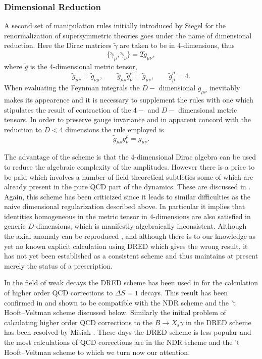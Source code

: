 \documentclass[12pt,rotate]{article}
\def\gat{\tilde{\gamma}}
\def\gt{\tilde{g}}
\newcommand{\be}{\begin{equation}}
\newcommand{\ee}{\end{equation}}
\begin{document}
\begin{itemize}
 \subsubsection{Dimensional Reduction}
 A second set of manipulation rules initially introduced by Siegel
 \cite{Si} for the renormalization of supersymmetric theories goes under
 the name of dimensional reduction. Here the Dirac matrices $\gat$ are taken
 to be in 4-dimensions, thus
\be\label{BW4}
 \{ \gat_{\mu} , \gat_{\nu} \} = 2 \gt_{\mu \nu},
\ee
 where $\gt$ is the 4-dimensional metric tensor,
\be\label{BW5}
 \gt_{\mu \nu} = \gt_{\nu \mu}, \qquad
 \gt_{\mu \rho} \gt^{\rho}_{\nu} = \gt_{\mu \nu}, \qquad
 \gt_{\mu}^{\mu} = 4.
\ee
 When evaluating the Feynman integrals the $D-$ dimensional
 $ g_{\mu\nu} $ inevitably makes
 its appearence and it is necessary to supplement the rules with one which
 stipulates the result of contraction of the $4-$ and $D-$ dimensional
 metric tensors. In order to preserve gauge invariance and in apparent concord
 with the reduction to $D<4$ dimensions the rule employed is
\be\label{BW6}
 \gt_{\mu \rho} g^{\rho}_{\nu} = g_{\mu \nu}.
\ee
 
 The advantage of the scheme is that the 4-dimensional Dirac algebra can be
 used to reduce the algebraic complexity of the amplitudes. However there is
 a price to be paid which involves a number of field theoretical subtleties
  some of which are already present in the pure QCD part of the dynamics.
 These are discussed in \cite{ACMP}.
 Again, this scheme has been criticized \cite{Bo,Ma} since it leads
 to similar
 difficulties as the naive dimensional regularization described above.
 In particular it implies that identities homogeneous in the metric tensor in
 $4$-dimensions are also satisfied in generic $D$-dimensions, which is
 manifestly algebraically inconsistent. Although
 the axial anomaly can be reproduced \cite{NT}, and although
 there is to our knowledge as yet no known explicit calculation using
 DRED which gives the wrong result, it
 has not yet been established as a consistent scheme and thus
 maintains at present merely the status of a prescription.

 In the field of weak decays the DRED scheme has been used in \cite{ACMP} 
for the calculation of higher order QCD corrections to $\Delta S=1$
decays.
This result has been confirmed in \cite{WEISZ} and shown to be compatible
with the NDR scheme and the 't Hooft--Veltman scheme discussed below.
Similarly the initial problem of calculating higher order QCD corrections
to the $B\to X_s\gamma$ in the DRED scheme \cite{CAND} has been
resolved by Misiak \cite{MISD}. 
These days the DRED scheme is less popular and the
most calculations of QCD corrections are in the NDR scheme and the
't Hooft--Veltman scheme to which we turn now our attention.

\end{itemize}
\end{document}
